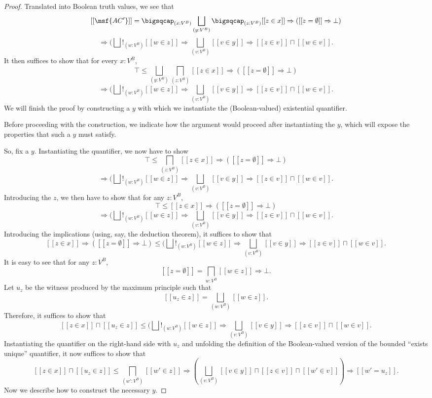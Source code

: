 \documentclass[11pt]{article}
\begin{document}
\begin{proof}
  Translated into Boolean truth values, we see that
  $$
[[\msf{AC'}]] = \bigsqcap_{(x : V^B)} \bigsqcup_{(y : V^B)} \bigsqcap_{(z : V^B)} [[z \in x]] \Rightarrow \left([[z = \emptyset]] \Rightarrow \bot \right) $$ $$ \Rightarrow (\bigsqcup!_{(w : V^B)} [[w \in z]] \Rightarrow \bigsqcup_{(v : V^B)} [[v \in y]] \Rightarrow [[z \in v]] \sqcap [[w \in v]].
$$
It then suffices to show that for every $x : V^B$,
$$
\top \leq \bigsqcup_{(y : V^B)} \bigsqcap_{(z : V^B)} [[z \in x]] \Rightarrow \left([[z = \emptyset]] \Rightarrow \bot \right) $$ $$ \Rightarrow (\bigsqcup!_{(w : V^B)} [[w \in z]] \Rightarrow \bigsqcup_{(v : V^B)} [[v \in y]] \Rightarrow [[z \in v]] \sqcap [[w \in v]].
$$
We will finish the proof by constructing a $y$ with which we instantiate the (Boolean-valued) existential quantifier.

Before proceeding with the construction, we indicate how the argument would proceed after instantiating the $y$, which will expose the properties that such a $y$ must satisfy.

So, fix a $y$. Instantiating the quantifier, we now have to show
$$
\top \leq \bigsqcap_{(z : V^B)} [[z \in x]] \Rightarrow \left([[z = \emptyset]] \Rightarrow \bot \right) $$ $$ \Rightarrow (\bigsqcup!_{(w : V^B)} [[w \in z]] \Rightarrow \bigsqcup_{(v : V^B)} [[v \in y]] \Rightarrow [[z \in v]] \sqcap [[w \in v]].
$$
Introducing the $z$, we then have to show that for any $z : V^B$,
$$
\top \leq [[z \in x]] \Rightarrow \left([[z = \emptyset]] \Rightarrow \bot \right) $$ $$ \Rightarrow (\bigsqcup!_{(w : V^B)} [[w \in z]] \Rightarrow \bigsqcup_{(v : V^B)} [[v \in y]] \Rightarrow [[z \in v]] \sqcap [[w \in v]].
$$
Introducing the implications (using, say, the deduction theorem), it suffices to show that
$$[[z \in x]] \Rightarrow \left([[z = \emptyset]] \Rightarrow \bot \right) \leq (\bigsqcup!_{(w : V^B)} [[w \in z]] \Rightarrow \bigsqcup_{(v : V^B)} [[v \in y]] \Rightarrow [[z \in v]] \sqcap [[w \in v]].
$$
It is easy to see that for any $z : V^B$, $$[[z = \emptyset]] = \bigsqcap_{w : V^B} [[w \in z]] \Rightarrow \bot.$$ Let $u_z$ be the witness produced by the maximum principle such that
$$
[[u_z \in z]] = \bigsqcup_{(w : V^B)} [[w \in z]].
$$
Therefore, it suffices to show that
$$
[[z \in x]] \sqcap [[u_z \in z]] \leq (\bigsqcup!_{(w : V^B)} [[w \in z]] \Rightarrow \bigsqcup_{(v : V^B)} [[v \in y]] \Rightarrow [[z \in v]] \sqcap [[w \in v]].
$$
Instantiating the quantifier on the right-hand side with $u_z$ and unfolding the definition of the Boolean-valued version of the bounded ``exists unique'' quantifier, it now suffices to show that
$$
[[z \in x]] \sqcap [[u_z \in z]] \leq \bigsqcap_{(w' : V^B)} [[w' \in z]] \Rightarrow \left( \bigsqcup_{(v : V^B)} [[v \in y]] \sqcap [[z \in v]] \sqcap [[w' \in v]] \right) \Rightarrow [[w' = u_z]].
$$
Now we describe how to construct the necessary $y$.


\end{proof}
\end{document}
